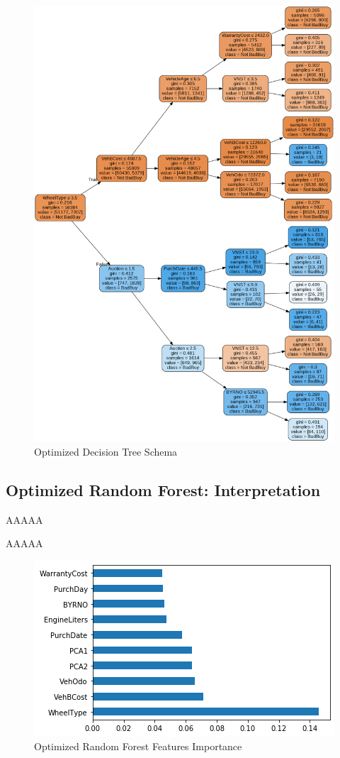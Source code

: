 \documentclass{article}
\begin{document}
	
	\begin{figure}[]
		\centering
		\includegraphics[height=.95\textheight]{dectree.png}
		\caption{Optimized Decision Tree Schema}
		\label{fig:optdectree}
	\end{figure}
	
	\subsection{Optimized Random Forest: Interpretation}
	AAAAA
	
	
	AAAAA
	
	\begin{figure}
		\centering
		\includegraphics[width=.4\textwidth]{rfw.png}
		\caption{Optimized Random Forest Features Importance}
		\label{fig:optdectree}
	\end{figure}
	
\end{document}
